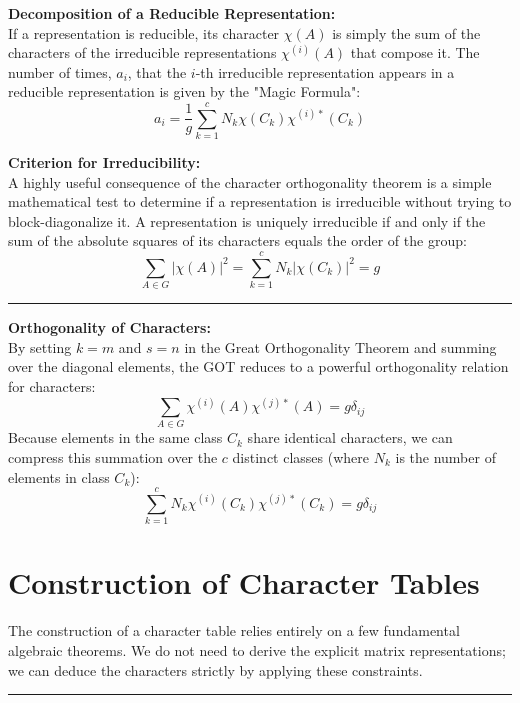 \documentclass[11pt, a4paper]{report}
\begin{document}
\textbf{Decomposition of a Reducible Representation:}\\
If a representation is reducible, its character $\chi(A)$ is simply the sum of the characters of the irreducible representations $\chi^{(i)}(A)$ that compose it. The number of times, $a_i$, that the $i$-th irreducible representation appears in a reducible representation is given by the "Magic Formula":
\[ a_i = \frac{1}{g} \sum_{k=1}^c N_k \chi(C_k) \chi^{(i)*}(C_k) \]

\textbf{Criterion for Irreducibility:}\\
A highly useful consequence of the character orthogonality theorem is a simple mathematical test to determine if a representation is irreducible without trying to block-diagonalize it. A representation is uniquely irreducible if and only if the sum of the absolute squares of its characters equals the order of the group:
\[ \sum_{A \in G} |\chi(A)|^2 = \sum_{k=1}^c N_k |\chi(C_k)|^2 = g \]
\vspace{1em}
\hrule
\vspace{1em}

\textbf{Orthogonality of Characters:}\\
By setting $k=m$ and $s=n$ in the Great Orthogonality Theorem and summing over the diagonal elements, the GOT reduces to a powerful orthogonality relation for characters:
\[ \sum_{A \in G} \chi^{(i)}(A) \chi^{(j)*}(A) = g \delta_{ij} \]
Because elements in the same class $C_k$ share identical characters, we can compress this summation over the $c$ distinct classes (where $N_k$ is the number of elements in class $C_k$):
\[ \sum_{k=1}^c N_k \chi^{(i)}(C_k) \chi^{(j)*}(C_k) = g \delta_{ij} \]
\section{Construction of Character Tables}

The construction of a character table relies entirely on a few fundamental algebraic theorems. We do not need to derive the explicit matrix representations; we can deduce the characters strictly by applying these constraints.

\vspace{1em}
\hrule
\vspace{1em}
\end{document}
